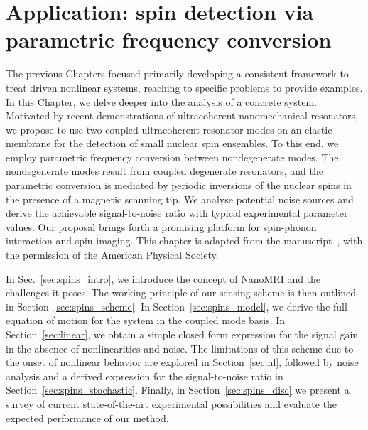 
\chapter{Application: spin detection via parametric frequency conversion} \label{ch:spins}

\begin{chapterabstract}
	The previous Chapters focused primarily developing a consistent framework to treat driven nonlinear systems, reaching to specific problems to provide examples. In this Chapter, we delve deeper into the analysis of a concrete system. Motivated by recent demonstrations of ultracoherent nanomechanical resonators, we propose to use two coupled ultracoherent resonator modes on an elastic membrane for the detection of small nuclear spin ensembles. To this end, we employ
	parametric frequency conversion between nondegenerate modes. The nondegenerate modes result from
	coupled degenerate resonators, and the parametric conversion is mediated by periodic inversions of the
	nuclear spins in the presence of a magnetic scanning tip. We analyse potential noise sources and derive
	the achievable signal-to-noise ratio with typical experimental parameter values. Our proposal brings forth a promising platform for spin-phonon interaction and spin imaging.
	\tcblower
	This chapter is adapted from the manuscript~\cite{Kosata_2020}, with the permission of the American Physical Society.
\end{chapterabstract}

In Sec.~\ref{sec:spins_intro}, we introduce the concept of NanoMRI and the challenges it poses. 
The working principle of our sensing scheme is then outlined in Section~\ref{sec:spins_scheme}. In Section~\ref{sec:spins_model}, we derive the full equation of motion for the system in the coupled mode basis. In Section~\ref{sec:linear}, we obtain a simple closed form expression for the signal gain in the absence of nonlinearities and noise. The limitations of this scheme due to the onset of nonlinear behavior are explored in Section~\ref{sec:nl}, followed by noise analysis and a derived expression for the signal-to-noise ratio in Section~\ref{sec:spins_stochastic}. Finally, in Section~\ref{sec:spins_disc} we present a survey of current state-of-the-art experimental possibilities and evaluate the expected performance of our method. 



